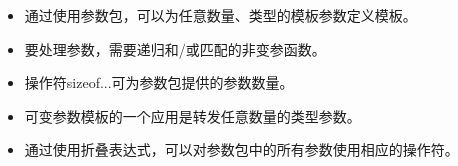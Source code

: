 
\begin{itemize}
\item 
通过使用参数包，可以为任意数量、类型的模板参数定义模板。

\item 
要处理参数，需要递归和/或匹配的非变参函数。

\item 
操作符sizeof...可为参数包提供的参数数量。

\item 
可变参数模板的一个应用是转发任意数量的类型参数。

\item 
通过使用折叠表达式，可以对参数包中的所有参数使用相应的操作符。
\end{itemize}